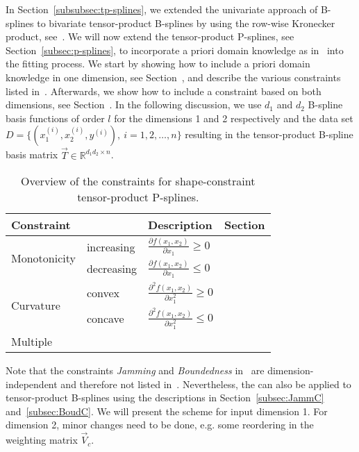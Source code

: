 In  Section~\ref{subsubsec:tp-splines}, we extended the univariate approach of B-splines to bivariate tensor-product B-splines by using the row-wise Kronecker product, see~. We will now extend the tensor-product P-splines, see Section~\ref{subsec:p-splines}, to incorporate a priori domain knowledge as in~ into the fitting process. We start by showing how to include a priori domain knowledge in one dimension, see Section~, and describe the various constraints listed in~. Afterwards, we show how to include a constraint based on both dimensions, see Section~. In the following discussion, we use $d_1$ and $d_2$ B-spline basis functions of order $l$ for the dimensions 1 and 2 respectively and the data set $D = \{(x_1^{(i)}, x_2^{(i)}, y^{(i)}), \ i=1,2,\dots,n\}$ resulting in the tensor-product B-spline basis matrix $\vec{T} \in \mathbb{R}^{d_1d_2 \times n}$.

\begin{table}[H]
	\centering
	\begin{tabular}{|l|ll|l|}
		\hline
		\textbf{Constraint}& & \textbf{Description}   & \textbf{Section}     \\ \hline \toprule
		\multirow{2}{*}{Monotonicity} & increasing & $ \frac{\partial f(x_1,x_2)}{\partial x_1} \ge 0$ 	& \pref{subsec:MIC-TP-one-dim} \\ \cline{2-4}
		& decreasing & $\frac{\partial f(x_1,x_2)}{\partial x_1} \le 0$  & \pref{subsec:MDC-TP-one-dim} \\ \hline	
		\multirow{2}{*}{Curvature}    & convex     & $\frac{\partial^2 f(x_1,x_2)}{\partial x_1^2}\ge 0$ 	& \pref{subsec:CONV-TP-one-dim} \\ \cline{2-4}
		& concave    & $\frac{\partial^2 f(x_1,x_2)}{\partial x_1^2}\le 0$ 	& \pref{subsec:CONC-TP-one-dim} \\ \hline 
		Multiple  & & & \pref{subsec:MULTICON-TP-one-dim} \\ \hline \bottomrule
	\end{tabular}
	\caption{Overview of the constraints for shape-constraint tensor-product P-splines.}
	\label{tab:constraint_overview_2d}
\end{table}

Note that the constraints \emph{Jamming} and \emph{Boundedness} in~ are dimension-independent and therefore not listed in~. Nevertheless, the can also be applied to tensor-product B-splines using the descriptions in Section~\ref{subsec:JammC} and~\ref{subsec:BoudC}. We will present the scheme for input dimension 1. For dimension 2, minor changes need to be done, e.g. some reordering in the weighting matrix $\vec{V}_c$. 

